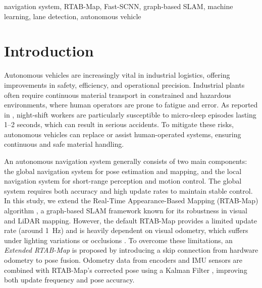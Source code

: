 \documentclass[conference, a4paper]{IEEEtran}
\begin{document}
\maketitle

\begin{abstract}
	This research develops a dual-layer navigation system for industrial autonomous vehicles. The first layer, an Extended RTAB-Map, performs global navigation and mapping. The second, a Reduced Fast-SCNN, handles local perception for lane detection. The Extended RTAB-Map introduces a skip connection from hardware odometry to pose fusion. The Reduced Fast-SCNN decreases convolutional channels and replaces pyramid pooling with average pooling. Experiments show an increase in pose update rate from 1~Hz to 50~Hz with centimeter-level accuracy (error $<5$~cm). The Reduced Fast-SCNN achieves real-time CPU-only inference below 10~ms.
	\end{abstract}

\begin{IEEEkeywords}
	navigation system, RTAB-Map, Fast-SCNN, graph-based SLAM, machine learning, lane detection, autonomous vehicle 
\end{IEEEkeywords}


\section{Introduction}
Autonomous vehicles are increasingly vital in industrial logistics, offering improvements in safety, efficiency, and operational precision. Industrial plants often require continuous material transport in constrained and hazardous environments, where human operators are prone to fatigue and error. As reported in \cite{ref_sleep}, night-shift workers are particularly susceptible to micro-sleep episodes lasting 1--2 seconds, which can result in serious accidents. To mitigate these risks, autonomous vehicles can replace or assist human-operated systems, ensuring continuous and safe material handling.

\par
An autonomous navigation system generally consists of two main components: the global navigation system for pose estimation and mapping, and the local navigation system for short-range perception and motion control. The global system requires both accuracy and high update rates to maintain stable control. In this study, we extend the Real-Time Appearance-Based Mapping (RTAB-Map) algorithm \cite{ref_rtabmap}, a graph-based SLAM framework known for its robustness in visual and LiDAR mapping. However, the default RTAB-Map provides a limited update rate (around 1~Hz) and is heavily dependent on visual odometry, which suffers under lighting variations or occlusions \cite{ref_vslam}. To overcome these limitations, an \textit{Extended RTAB-Map} is proposed by introducing a skip connection from hardware odometry to pose fusion. Odometry data from encoders and IMU sensors are combined with RTAB-Map’s corrected pose using a Kalman Filter \cite{ref_mas_marin}, improving both update frequency and pose accuracy.
\end{document}
